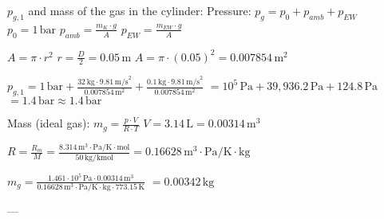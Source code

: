 \( p_{g,1} \) and mass of the gas in the cylinder:  
Pressure:  
\( p_{g} = p_{0} + p_{amb} + p_{EW} \)  
\( p_{0} = 1 \, \text{bar} \)  
\( p_{amb} = \frac{m_{K} \cdot g}{A} \)  
\( p_{EW} = \frac{m_{EW} \cdot g}{A} \)  

\( A = \pi \cdot r^2 \)  
\( r = \frac{D}{2} = 0.05 \, \text{m} \)  
\( A = \pi \cdot (0.05)^2 = 0.007854 \, \text{m}^2 \)  

\( p_{g,1} = 1 \, \text{bar} + \frac{32 \, \text{kg} \cdot 9.81 \, \text{m/s}^2}{0.007854 \, \text{m}^2} + \frac{0.1 \, \text{kg} \cdot 9.81 \, \text{m/s}^2}{0.007854 \, \text{m}^2} \)  
\( = 10^5 \, \text{Pa} + 39,936.2 \, \text{Pa} + 124.8 \, \text{Pa} \)  
\( = 1.4 \, \text{bar} \approx 1.4 \, \text{bar} \)  

Mass (ideal gas):  
\( m_{g} = \frac{p \cdot V}{R \cdot T} \)  
\( V = 3.14 \, \text{L} = 0.00314 \, \text{m}^3 \)  

\( R = \frac{R_{m}}{M} = \frac{8.314 \, \text{m}^3 \cdot \text{Pa}/\text{K} \cdot \text{mol}}{50 \, \text{kg}/\text{kmol}} = 0.16628 \, \text{m}^3 \cdot \text{Pa}/\text{K} \cdot \text{kg} \)  

\( m_{g} = \frac{1.461 \cdot 10^5 \, \text{Pa} \cdot 0.00314 \, \text{m}^3}{0.16628 \, \text{m}^3 \cdot \text{Pa}/\text{K} \cdot \text{kg} \cdot 773.15 \, \text{K}} \)  
\( = 0.00342 \, \text{kg} \)  

---